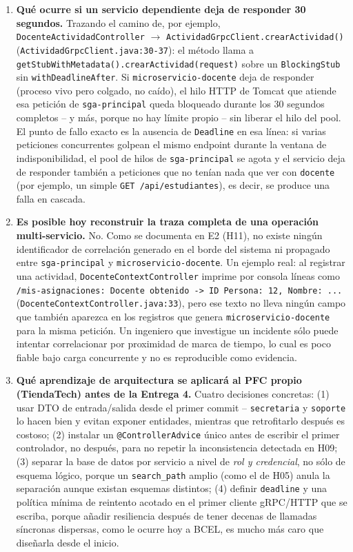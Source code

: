 \documentclass[11pt,a4paper]{article}
\begin{document}
\begin{enumerate}[leftmargin=*,label=\textbf{P\arabic*.}]
\item \textbf{Qu\'e ocurre si un servicio dependiente deja de responder 30 segundos.}
Trazando el camino de, por ejemplo, \texttt{DocenteActividadController} $\to$ \texttt{ActividadGrpcClient.crearActividad()} (\texttt{ActividadGrpcClient.java:30-37}): el m\'etodo llama a \texttt{getStubWithMetadata().crearActividad(request)} sobre un \texttt{BlockingStub} sin \texttt{withDeadlineAfter}. Si \texttt{microservicio-docente} deja de responder (proceso vivo pero colgado, no ca\'ido), el hilo HTTP de Tomcat que atiende esa petici\'on de \texttt{sga-principal} queda bloqueado durante los 30 segundos completos -- y m\'as, porque no hay l\'imite propio -- sin liberar el hilo del pool. El punto de fallo exacto es la ausencia de \texttt{Deadline} en esa l\'inea: si varias peticiones concurrentes golpean el mismo endpoint durante la ventana de indisponibilidad, el pool de hilos de \texttt{sga-principal} se agota y el servicio deja de responder tambi\'en a peticiones que no ten\'ian nada que ver con \texttt{docente} (por ejemplo, un simple \texttt{GET /api/estudiantes}), es decir, se produce una falla en cascada.


\item \textbf{Es posible hoy reconstruir la traza completa de una operaci\'on multi-servicio.}
No. Como se documenta en E2 (H11), no existe ning\'un identificador de correlaci\'on generado en el borde del sistema ni propagado entre \texttt{sga-principal} y \texttt{microservicio-docente}. Un ejemplo real: al registrar una actividad, \texttt{DocenteContextController} imprime por consola l\'ineas como \texttt{ /mis-asignaciones: Docente obtenido -> ID Persona: 12, Nombre: ...\textquotedbl} (\texttt{DocenteContextController.java:33}), pero ese texto no lleva ning\'un campo que tambi\'en aparezca en los registros que genera \texttt{microservicio-docente} para la misma petici\'on. Un ingeniero que investigue un incidente s\'olo puede intentar correlacionar por proximidad de marca de tiempo, lo cual es poco fiable bajo carga concurrente y no es reproducible como evidencia.

\item \textbf{Qu\'e aprendizaje de arquitectura se aplicar\'a al PFC propio (TiendaTech) antes de la Entrega 4.}
Cuatro decisiones concretas: (1) usar DTO de entrada/salida desde el primer commit -- \texttt{secretaria} y \texttt{soporte} lo hacen bien y evitan exponer entidades, mientras que retrofitarlo despu\'es es costoso; (2) instalar un \texttt{@ControllerAdvice} \'unico antes de escribir el primer controlador, no despu\'es, para no repetir la inconsistencia detectada en H09; (3) separar la base de datos por servicio a nivel de \emph{rol y credencial}, no s\'olo de esquema l\'ogico, porque un \texttt{search\_path} amplio (como el de H05) anula la separaci\'on aunque existan esquemas distintos; (4) definir \texttt{deadline} y una pol\'itica m\'inima de reintento acotado en el primer cliente gRPC/HTTP que se escriba, porque a\~nadir resiliencia despu\'es de tener decenas de llamadas s\'incronas dispersas, como le ocurre hoy a BCEL, es mucho m\'as caro que dise\~narla desde el inicio.
\end{enumerate}
\end{document}
